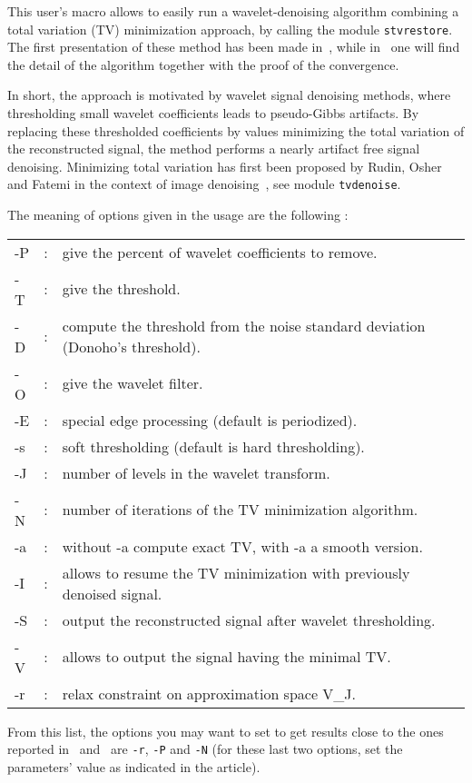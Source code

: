 This user's macro allows to easily run a wavelet-denoising algorithm
combining a total variation (TV) minimization approach, 
by calling the module {\tt stvrestore}. 
The first presentation of these method has been made in~\cite{durand.froment:artifact}, 
while in~\cite{durand.froment:reconstruction} one will find the detail of the algorithm 
together with the proof of the convergence.

In short, the approach is motivated by wavelet signal denoising methods, where 
thresholding small wavelet coefficients leads to pseudo-Gibbs artifacts. By replacing
these thresholded coefficients by values minimizing the total variation of the
reconstructed signal, the method performs a nearly artifact free signal denoising.
Minimizing total variation has first been proposed by Rudin, Osher and Fatemi
in the context of image denoising~\cite{rudin.osher.ea:nonlinear}\cite{rudin.osher:total},
see module {\tt tvdenoise}.

The meaning of options given in the usage are the following :

\begin{tabular}{lcl}
-P &:& give the percent of wavelet coefficients to remove.\\
-T &:& give the threshold.\\
-D &:& compute the threshold from the noise standard deviation (Donoho's threshold).\\
-O &:& give the wavelet filter.\\
-E &:& special edge processing (default is periodized).\\
-s &:& soft thresholding (default is hard thresholding).\\
-J &:& number of levels in the wavelet transform.\\
-N &:& number of iterations of the TV minimization algorithm.\\
-a &:& without -a compute exact TV, with -a a smooth version.\\
-I &:& allows to resume the TV minimization with previously denoised signal.\\
-S &:& output the reconstructed signal after wavelet thresholding.\\
-V &:& allows to output the signal having the minimal TV.\\
-r &:& relax constraint on approximation space V\_J.
\end{tabular}

From this list, the options you may want to set to get results close to the ones
reported in~\cite{durand.froment:artifact} and~\cite{durand.froment:reconstruction} are
{\tt -r}, {\tt -P} and {\tt -N} (for these last two options, set the parameters' value as
indicated in the article).

